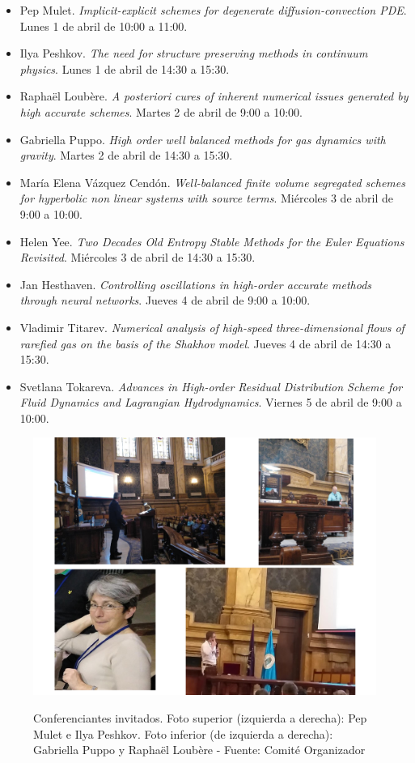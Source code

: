 \documentclass[twoside]{article}
\begin{document}
\begin{itemize}
	\item Pep Mulet. \textit{Implicit-explicit schemes for degenerate diffusion-convection PDE}. Lunes 1 de abril de 10:00 a 11:00.
	\item Ilya Peshkov. \textit{The need for structure preserving methods in continuum physics}. Lunes 1 de abril de 14:30 a 15:30.
	\item Raphaël Loubère. \textit{A posteriori cures of inherent numerical issues generated by high accurate schemes}. Martes 2 de abril de 9:00 a 10:00.
	\item Gabriella Puppo. \textit{High order well balanced methods for gas dynamics with gravity}. Martes 2 de abril de 14:30 a 15:30.
	\item María Elena Vázquez Cendón. \textit{Well-balanced finite volume segregated schemes for hyperbolic non linear systems with source terms}. Miércoles 3 de abril de 9:00 a 10:00.
	\item Helen Yee. \textit{Two Decades Old Entropy Stable Methods for the Euler Equations Revisited}. Miércoles 3 de abril de 14:30 a 15:30.
	\item Jan Hesthaven. \textit{Controlling oscillations in high-order accurate methods through neural networks}. Jueves 4 de abril de 9:00 a 10:00.
	\item Vladimir Titarev. \textit{Numerical analysis of high-speed three-dimensional flows of rarefied gas on the basis of the Shakhov model}. Jueves 4 de abril de 14:30 a 15:30.
	\item Svetlana Tokareva. \textit{Advances in High-order Residual Distribution Scheme for Fluid Dynamics and Lagrangian Hydrodynamics}. Viernes 5 de abril de 9:00 a 10:00.
\end{itemize}
%
\begin{center}
\begin{figure}
	\centering
		\includegraphics[width=1.2\textwidth]{FotosInv1}
	\label{fig:Invitados1}
	\caption{Conferenciantes invitados. Foto superior (izquierda a derecha): Pep Mulet e Ilya Peshkov. Foto inferior (de izquierda a derecha): Gabriella Puppo y Raphaël Loubère  - Fuente: Comité Organizador}
\end{figure}
\end{center}
\end{document}
